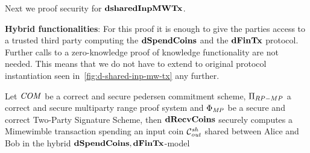 Next we proof security for $\mathbf{dsharedInpMWTx}$.

\textbf{Hybrid functionalities}: For this proof it is enough to give the parties access to a trusted third party computing the $\mathbf{dSpendCoins}$ and the $\mathbf{dFinTx}$ protocol.
Further calls to a zero-knowledge proof of knowledge functionality are not needed.
This means that we do not have to extend to original protocol instantiation seen in~\cref{fig:d-shared-inp-mw-tx} any further.

\begin{theorem}
    \label{teo:atom:sec-dshared-inp}
    Let $\mathit{COM}$ be a correct and secure pedersen commitment scheme, $\Pi_{RP-MP}$ a correct and secure multiparty range proof system and $\Phi_{\mathit{MP}}$ be a secure and correct Two-Party Signature Scheme, then $\mathbf{dRecvCoins}$ securely computes a Mimewimble transaction spending an input coin $\mathcal{C}_{\mathit{out}}^{\mathit{sh}}$ shared between Alice and Bob in the hybrid $\mathbf{dSpendCoins},\mathbf{dFinTx}$-model
\end{theorem}

